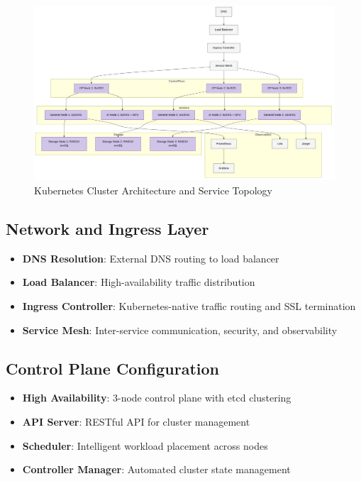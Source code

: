 \documentclass[12pt]{report}
\begin{document}
\begin{figure}[htbp]
\centering
\includegraphics[width=\textwidth,height=0.8\textheight,keepaspectratio]{../../pics/arch.png}
\caption{Kubernetes Cluster Architecture and Service Topology}
\label{fig:k8s-architecture}
\end{figure}

\subsection{Network and Ingress Layer}
\begin{itemize}
  \item \textbf{DNS Resolution}: External DNS routing to load balancer
  \item \textbf{Load Balancer}: High-availability traffic distribution
  \item \textbf{Ingress Controller}: Kubernetes-native traffic routing and SSL termination
  \item \textbf{Service Mesh}: Inter-service communication, security, and observability
\end{itemize}

\subsection{Control Plane Configuration}
\begin{itemize}
  \item \textbf{High Availability}: 3-node control plane with etcd clustering
  \item \textbf{API Server}: RESTful API for cluster management
  \item \textbf{Scheduler}: Intelligent workload placement across nodes
  \item \textbf{Controller Manager}: Automated cluster state management
\end{itemize}
\end{document}
